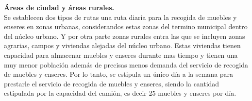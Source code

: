 \textbf{Áreas de ciudad y áreas rurales.} \\
Se establecen dos tipos de rutas una ruta diaria para la recogida de muebles y enseres en zonas urbanas, considerandos estas zonas del termino municipal dentro del núcleo urbano. Y por otra parte zonas rurales entra las que se incluyen zonas agrarias, campos y viviendas alejadas del núcleo urbano. Estas viviendas tienen capacidad para almacenar muebles y enseres durante mas tiempo y tienen una muy menor población además de precisas menos demanda del servicio de recogida de muebles y enseres. Por lo tanto, se estipula un único día a la semana para prestarle el servicio de recogida de muebles y enseres, siendo la cantidad estipulada por la capacidad del camión, es decir 25 muebles y enseres por día. \\